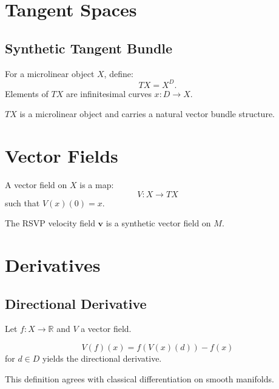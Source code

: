\section{Tangent Spaces}

\subsection{Synthetic Tangent Bundle}

\begin{definition}
For a microlinear object $X$, define:
\[
TX = X^D.
\]
Elements of $TX$ are infinitesimal curves $x : D\to X$.
\end{definition}

\begin{proposition}
$TX$ is a microlinear object and carries a natural vector bundle structure.
\end{proposition}

\section{Vector Fields}

\begin{definition}
A vector field on $X$ is a map:
\[
V : X \to TX
\]
such that $V(x)(0)=x$.
\end{definition}

\begin{proposition}
The RSVP velocity field $\mathbf{v}$ is a synthetic vector field on $M$.
\end{proposition}

\section{Derivatives}

\subsection{Directional Derivative}

Let $f : X\to \mathbb{R}$ and $V$ a vector field.

\begin{definition}
\[
V(f)(x) = f(V(x)(d)) - f(x)
\]
for $d\in D$ yields the directional derivative.
\end{definition}

\begin{proposition}
This definition agrees with classical differentiation on smooth manifolds.
\end{proposition}

